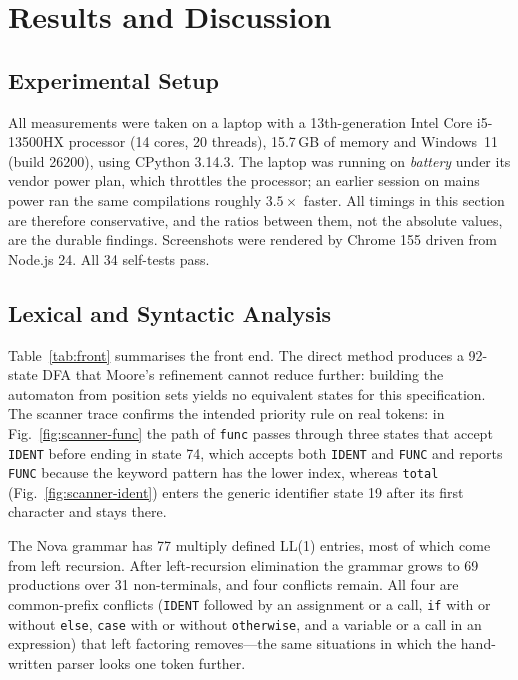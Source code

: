 \documentclass[conference]{IEEEtran}
\newcommand{\code}[1]{\texttt{#1}}
\begin{document}
\section{Results and Discussion}
\label{sec:results}

\subsection{Experimental Setup}
All measurements were taken on a laptop with a 13th-generation Intel Core i5-13500HX processor (14 cores, 20 threads), 15.7\,GB of memory and Windows~11 (build 26200), using CPython 3.14.3. The laptop was running on \emph{battery} under its vendor power plan, which throttles the processor; an earlier session on mains power ran the same compilations roughly $3.5\times$ faster. All timings in this section are therefore conservative, and the ratios between them, not the absolute values, are the durable findings. Screenshots were rendered by Chrome 155 driven from Node.js 24. All 34 self-tests pass.

\subsection{Lexical and Syntactic Analysis}
\label{sec:res-front}
Table~\ref{tab:front} summarises the front end. The direct method produces a 92-state DFA that Moore's refinement cannot reduce further: building the automaton from position sets yields no equivalent states for this specification. The scanner trace confirms the intended priority rule on real tokens: in Fig.~\ref{fig:scanner-func} the path of \code{func} passes through three states that accept \code{IDENT} before ending in state 74, which accepts both \code{IDENT} and \code{FUNC} and reports \code{FUNC} because the keyword pattern has the lower index, whereas \code{total} (Fig.~\ref{fig:scanner-ident}) enters the generic identifier state 19 after its first character and stays there.

The Nova grammar has 77 multiply defined LL(1) entries, most of which come from left recursion. After left-recursion elimination the grammar grows to 69 productions over 31 non-terminals, and four conflicts remain. All four are common-prefix conflicts (\code{IDENT} followed by an assignment or a call, \code{if} with or without \code{else}, \code{case} with or without \code{otherwise}, and a variable or a call in an expression) that left factoring removes---the same situations in which the hand-written parser looks one token further.
\end{document}

